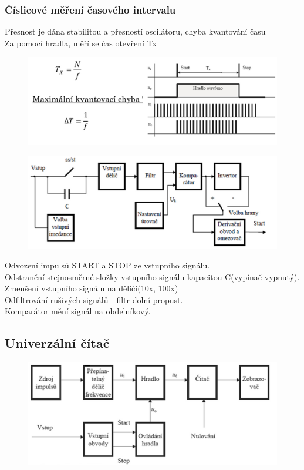 \subsubsection*{Číslicové měření časového intervalu}
Přesnost je dána stabilitou a přesností oscilátoru, chyba kvantování času\\
Za pomocí hradla, měří se čas otevření Tx\\
\begin{figure}[H]
    \includegraphics*[scale = 1]{images/minKvantChyb.png}    
\end{figure}

\begin{figure}[H]
    \includegraphics*[scale = 1]{images/minKvantChyb2.png}
\end{figure}

Odvození impulsů START a STOP ze vstupního signálu.\\
Odstranění stejnosměrné složky vstupního signálu kapacitou C(vypínač vypnutý).\\
Zmenšení vstupního signálu na děliči(10x, 100x)\\
Odfiltrování rušivých signálů - filtr dolní propust.\\
Komparátor mění signál na obdelníkový.\\

\subsection*{Univerzální čítač}
\begin{figure}[H]
    \includegraphics*[scale = 1]{images/univerzalniCitac.png}
\end{figure}
